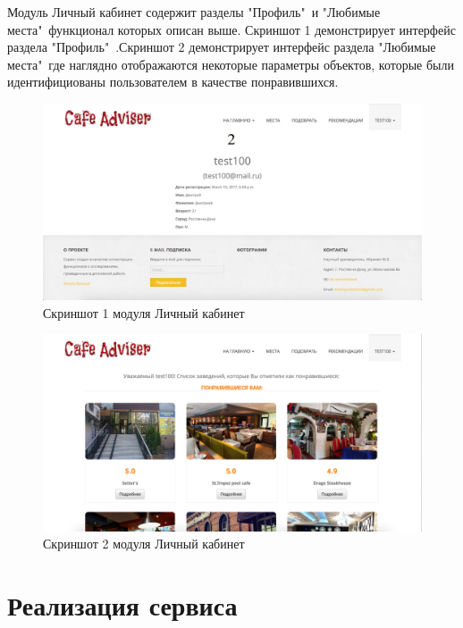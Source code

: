 Модуль Личный кабинет содержит разделы "Профиль"\ и "Любимые места"\ функционал которых описан выше. Скриншот 1 демонстрирует интерфейс раздела "Профиль"\ .Скриншот 2 демонстрирует интерфейс раздела "Любимые места"\, где наглядно отображаются некоторые параметры объектов, которые были идентифициованы пользователем в качестве понравившихся. 

\begin{figure}%
	\centering
	\includegraphics[width=\textwidth]{img/profile1.png}
	\caption{\label{fig:tan-aus}Скриншот 1 модуля Личный кабинет}
\end{figure}

\begin{figure}%
	\centering
	\includegraphics[width=\textwidth]{img/profile2.png}
	\caption{\label{fig:tan-aus}Скриншот 2 модуля Личный кабинет}
\end{figure}

\section{Реализация сервиса}

